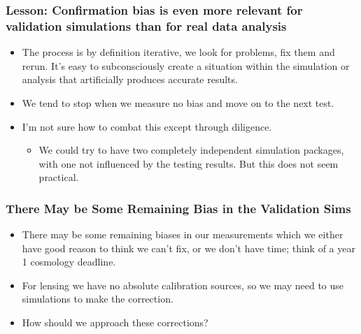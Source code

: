 \documentclass{beamer}
\begin{document}
\frame
{

    \frametitle{Lesson: Confirmation bias is even more relevant for validation
    simulations than for real data analysis }


    \begin{itemize}

        \item The process is by definition iterative, we look for problems, fix
            them and rerun.  It's easy to subconsciously create a situation
            within the simulation or analysis that artificially produces
            accurate results.

        \item We tend to stop when we measure no bias and move on to the next
            test.

        \item I'm not sure how to combat this except through diligence.
            \begin{itemize}

                \item We could try to have two completely independent simulation
                    packages, with one not influenced by the testing results.  But
                    this does not seem practical.

            \end{itemize}

    \end{itemize}

}

\frame
{

    \frametitle{There May be Some Remaining Bias in the Validation Sims}

    \begin{itemize}

        \item There may be some remaining biases in our measurements which we
            either have good reason to think we can't fix, or we don't
            have time; think of a year 1 cosmology deadline.

        \item For lensing we have no absolute calibration sources, so we may need to use
            simulations to make the correction.

        \item How should we approach these corrections?

    \end{itemize}

}
\end{document}
